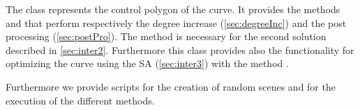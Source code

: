 \documentclass[dissertation.tex]{subfiles}
\begin{document}
The class  represents the control polygon of the curve. It
provides the methods  and  that
perform respectively the degree increase (\cref{sec:degreeInc}) and
the post processing (\cref{sec:postPro}). The method  is
necessary for the second solution described in
\cref{sec:inter2}. Furthermore this class provides also the
functionality for optimizing the curve using the \ac{SA}
(\cref{sec:inter3}) with the method .

Furthermore we provide scripts for the creation of random scenes and
for the execution of the different methods.
\end{document}
